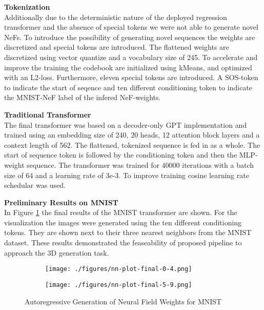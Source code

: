 \noindent
\textbf{Tokenization}\\
Additionally due to the deterministic nature of the deployed regression transformer and the absence of special tokens we were not able to generate novel NeFs. To introduce the possibility of generating novel sequences the weights are discretized and special tokens are introduced. The flattened weights are discretized using vector quantize and a vocabulary size of 245. To accelerate and improve the training the codebook are initialized using kMeans, and optimized with an L2-loss. Furthermore, eleven special tokens are introduced. A SOS-token to indicate the start of seqence and ten different conditioning token to indicate the MNIST-NeF label of the infered NeF-weights.
\vspace{1em}

\noindent
\textbf{Traditional Transformer}\\
The final transformer was based on a decoder-only GPT implementation \cite{Karpathy2022} and trained using an embedding size of 240, 20 heads, 12 attention block layers and a context length of 562. The flattened, tokenized sequence is fed in as a whole. The start of sequence token is followed by the conditioning token and then the MLP-weight sequence. The transformer was trained for 40000 iterations with a batch size of 64 and a learning rate of 3e-3. To improve training cosine learning rate schedular was used.
\vspace{1em}

\noindent
\textbf{Preliminary Results on MNIST}\\
In Figure \ref{fig:mnist} the final results of the MNIST transformer are shown. For the visualization the images were generated using the ten different conditioning tokens. They are shown next to their three nearest neighbors from the MNIST dataset. These results demonstrated the feaseability of proposed pipeline to approach the 3D generation task.

\begin{figure}[H]
  \begin{mdframed}[backgroundcolor=mnistbg]

    \centering
    \begin{subfigure}{.5\linewidth}
      \centering
      \texttt{[image: ./figures/nn-plot-final-0-4.png]}
    \end{subfigure}%
    \begin{subfigure}{.5\linewidth}
      \centering
      \texttt{[image: ./figures/nn-plot-final-5-9.png]}
    \end{subfigure}

  \end{mdframed}
  \caption{\label{fig:mnist} Autoregressive Generation of Neural Field Weights for MNIST}
\end{figure}


